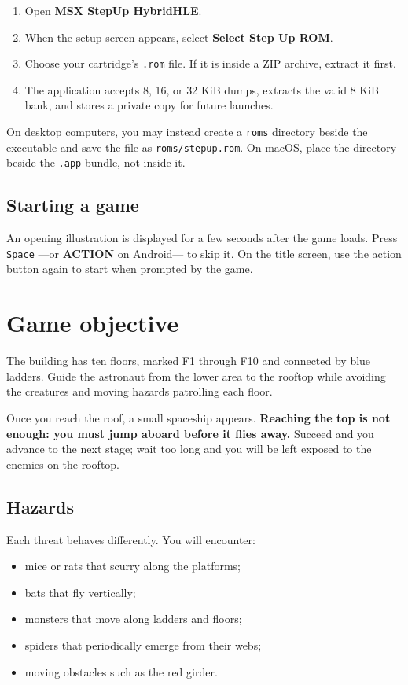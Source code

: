 \documentclass[11pt,a4paper]{article}
\newcommand{\keycap}[1]{%
  \begingroup
  \setlength{\fboxsep}{3pt}%
  \colorbox{softgray}{\texttt{#1}}%
  \endgroup
}
\begin{document}
\begin{enumerate}
  \item Open \textbf{MSX StepUp HybridHLE}.
  \item When the setup screen appears, select
        \textbf{Select Step Up ROM}.
  \item Choose your cartridge's \texttt{.rom} file. If it is inside a ZIP
        archive, extract it first.
  \item The application accepts 8, 16, or 32 KiB dumps, extracts the valid
        8 KiB bank, and stores a private copy for future launches.
\end{enumerate}

On desktop computers, you may instead create a \texttt{roms} directory beside
the executable and save the file as \texttt{roms/stepup.rom}. On macOS, place
the directory beside the \texttt{.app} bundle, not inside it.

\subsection{Starting a game}

An opening illustration is displayed for a few seconds after the game loads.
Press \keycap{Space} ---or \textbf{ACTION} on Android--- to skip it. On the
title screen, use the action button again to start when prompted by the game.

\section{Game objective}

The building has ten floors, marked F1 through F10 and connected by blue
ladders. Guide the astronaut from the lower area to the rooftop while avoiding
the creatures and moving hazards patrolling each floor.

Once you reach the roof, a small spaceship appears. \textbf{Reaching the top
is not enough: you must jump aboard before it flies away.} Succeed and you
advance to the next stage; wait too long and you will be left exposed to the
enemies on the rooftop.

\subsection{Hazards}

Each threat behaves differently. You will encounter:

\begin{itemize}
  \item mice or rats that scurry along the platforms;
  \item bats that fly vertically;
  \item monsters that move along ladders and floors;
  \item spiders that periodically emerge from their webs;
  \item moving obstacles such as the red girder.
\end{itemize}
\end{document}
